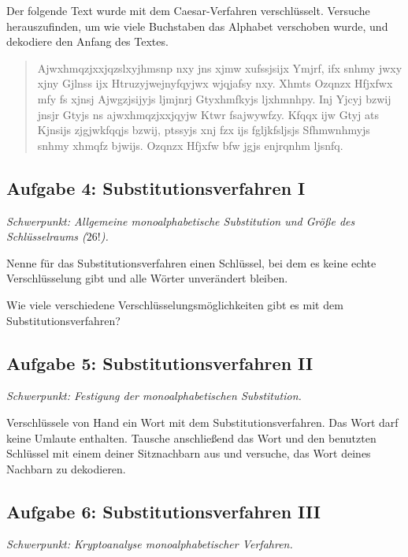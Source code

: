 Der folgende Text wurde mit dem Caesar-Verfahren verschlüsselt. Versuche
herauszufinden, um wie viele Buchstaben das Alphabet verschoben wurde, und
dekodiere den Anfang des Textes.

\begin{quotation}
\noindent
Ajwxhmqzjxxjqzslxyjhmsnp nxy jns xjmw xufssjsijx Ymjrf, ifx snhmy jwxy xjny
Gjlnss ijx Htruzyjwejnyfqyjwx wjqjafsy nxy. Xhmts Ozqnzx Hfjxfwx mfy fs xjnsj
Ajwgzjsijyjs ljmjnrj Gtyxhmfkyjs ljxhmnhpy. Inj Yjcyj bzwij jnsjr Gtyjs ns
ajwxhmqzjxxjqyjw Ktwr fsajwywfzy. Kfqqx ijw Gtyj ats Kjnsijs zjgjwkfqqjs bzwij,
ptssyjs xnj fzx ijs fgljkfsljsjs Sfhmwnhmyjs snhmy xhmqfz bjwijs. Ozqnzx Hfjxfw
bfw jgjs enjrqnhm ljsnfq.
\end{quotation}


\subsection{Aufgabe 4: Substitutionsverfahren I \tagGKWahl}
\noindent \emph{Schwerpunkt: Allgemeine monoalphabetische Substitution und Größe des Schlüsselraums ($26!$).}

\begin{compactenum}[a)]
\item Nenne für das Substitutionsverfahren einen Schlüssel, bei dem es keine
echte Verschlüsselung gibt und alle Wörter unverändert bleiben.
\item Wie viele verschiedene Verschlüsselungsmöglichkeiten gibt es mit dem
Substitutionsverfahren?
\end{compactenum}


\subsection{Aufgabe 5: Substitutionsverfahren II \tagZusatz \tagGKWahl}
\noindent \emph{Schwerpunkt: Festigung der monoalphabetischen Substitution.}

Verschlüssele von Hand ein Wort mit dem Substitutionsverfahren. Das Wort darf
keine Umlaute enthalten. Tausche anschließend das Wort und den benutzten
Schlüssel mit einem deiner Sitznachbarn aus und versuche, das Wort deines
Nachbarn zu dekodieren.


\subsection{Aufgabe 6: Substitutionsverfahren III \tagGKWahl}
\noindent \emph{Schwerpunkt: Kryptoanalyse monoalphabetischer Verfahren.}

